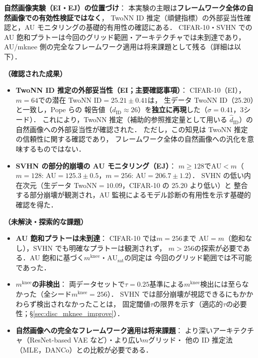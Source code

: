 \documentclass[11pt,a4paper]{jsarticle}
\newcommand{\AUsat}{\mathrm{AU}_{\mathrm{sat}}}
\newcommand{\mknee}{m^{\mathrm{knee}}}
\begin{document}
\textbf{自然画像実験（EI・EJ）の位置づけ}：
本実験の主眼は\textbf{フレームワーク全体の自然画像での有効性検証ではなく}，
TwoNN ID 推定（頑健指標）の外部妥当性確認と，AU モニタリングの基礎的有用性の確認にある．
CIFAR-10・SVHN での AU 飽和プラトーは今回のグリッド範囲・アーキテクチャでは未到達であり，
AU/mknee 側の完全なフレームワーク適用は将来課題として残る（詳細は以下）．

\textbf{（確認された成果）}
\begin{itemize}
  \item \textbf{TwoNN ID 推定の外部妥当性（EI；主要確認事項）}：
        CIFAR-10（EI），$m=64$での潜在 TwoNN ID$=25.21\pm0.41$は，
        生データ TwoNN ID（25.20）と一致し，Pope ら\cite{pope2021intrinsic}の
        報告値（$d_\mathrm{ID} \approx 26$）を\textbf{独立に再現}した（$\sigma=0.41$，3シード）．
        これにより，TwoNN 推定（補助的参照推定量として用いる $\hat{d}_\mathrm{ID}$）の
        自然画像への外部妥当性が確認された．
        ただし，この知見は TwoNN 推定の信頼性に関する確認であり，
        フレームワーク全体の自然画像への汎化を意味するものではない．
  \item \textbf{SVHN の部分的崩壊の AU モニタリング（EJ）}：
        $m \geq 128$でAU$< m$（$m=128$: AU$=125.3\pm0.5$，$m=256$: AU$=206.7\pm1.2$）．
        SVHN の低い内在次元（生データ TwoNN$=10.09$，CIFAR-10 の 25.20 より低い）と
        整合する部分崩壊が観測され，AU 監視によるモデル診断の有用性を示す基礎的確認を得た．
\end{itemize}

\textbf{（未解決・探索的な課題）}
\begin{itemize}
  \item \textbf{AU 飽和プラトーは未到達}：
        CIFAR-10 では$m=256$まで AU$=m$（飽和なし），SVHN でも明確なプラトーは観測されず，
        $m > 256$の探索が必要である．AU 飽和に基づく$\mknee$・$\AUsat$の同定は
        今回のグリッド範囲では不可能であった．
  \item \textbf{$\mknee$の非検出}：
        両データセットで$\tau = 0.25$基準による$\mknee$検出には至らなかった（全シード$\mknee=256$）．
        SVHN では部分崩壊が視認できるにもかかわらず検出されなかったことは，
        固定閾値$\tau$の限界を示す（適応的$\tau$の必要性；§\ref{sec:disc_mknee_improve}）．
  \item \textbf{自然画像への完全なフレームワーク適用は将来課題}：
        より深いアーキテクチャ（ResNet-based VAE など）・より広い$m$グリッド・
        他の ID 推定法（MLE，DANCo）との比較が必要である．
\end{itemize}
\end{document}
